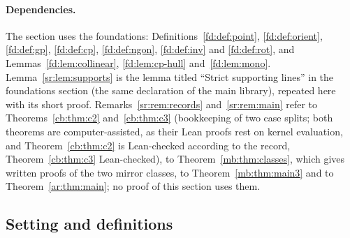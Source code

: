 \paragraph{Dependencies.}
The section uses the foundations: Definitions~\ref{fd:def:point}, \ref{fd:def:orient}, \ref{fd:def:gp},
\ref{fd:def:cp}, \ref{fd:def:ngon}, \ref{fd:def:inv} and \ref{fd:def:rot}, and Lemmas~\ref{fd:lem:collinear},
\ref{fd:lem:cp-hull} and~\ref{fd:lem:mono}. Lemma~\ref{sr:lem:supports} is the lemma titled ``Strict supporting
lines'' in the foundations section (the same declaration of the main library), repeated here with its short proof.
Remarks~\ref{sr:rem:records}
and~\ref{sr:rem:main} refer to Theorems~\ref{cb:thm:c2} and~\ref{cb:thm:c3} (bookkeeping of two case splits; both
theorems are computer-assisted, as their Lean proofs rest on kernel evaluation, and Theorem~\ref{cb:thm:c2} is
Lean-checked according to the record, Theorem~\ref{cb:thm:c3} Lean-checked), to Theorem~\ref{mb:thm:classes}, which
gives written proofs of the two mirror classes, to Theorem~\ref{mb:thm:main3} and to Theorem~\ref{ar:thm:main}; no
proof of this section uses them.

\subsection{Setting and definitions}\label{sr:ssec:defs}

